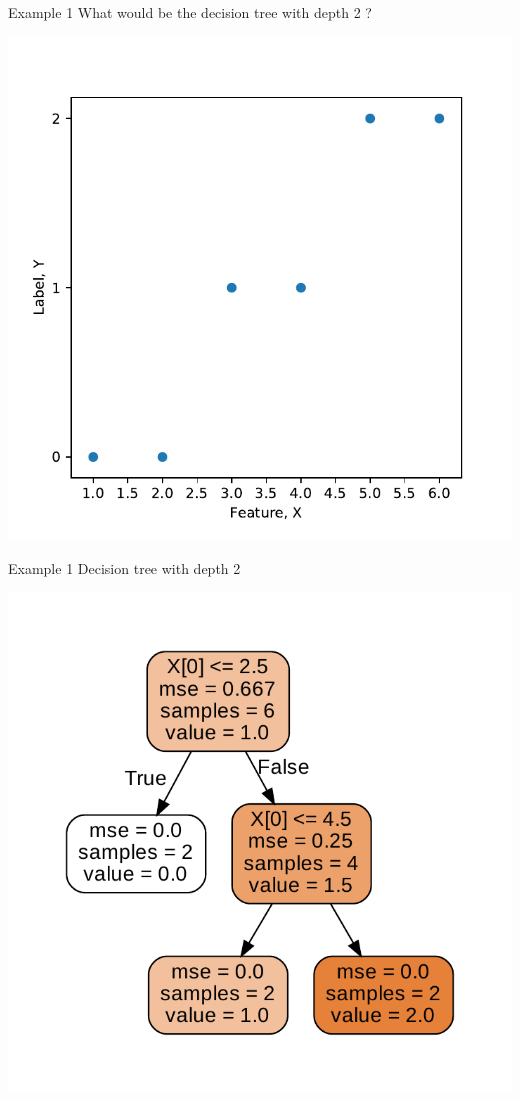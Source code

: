 \documentclass{beamer}
\begin{document}
	\begin{frame}{Example 1}
	What would be the decision tree with depth 2	?
	\begin{center}
	\includegraphics[scale=0.5]{dataset}
	\end{center}
	\end{frame}

	\begin{frame}{Example 1}
	Decision tree with depth 2
	\begin{center}
	\includegraphics[scale=0.65]{depth-2-decision-tree}	
	\end{center}
	\end{frame}
\end{document}
